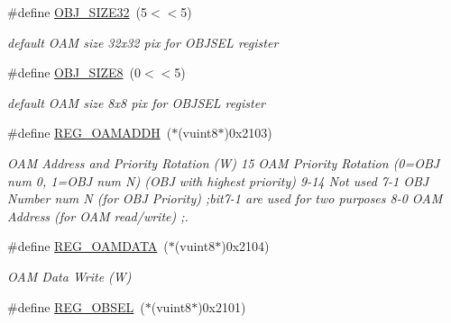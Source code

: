 \begin{DoxyCompactItemize}
\mbox{\label{a00350_abc6679a83d9647eac01c3d51ef37151a}} 
\#define \hyperlink{a00350_abc6679a83d9647eac01c3d51ef37151a}{O\+B\+J\+\_\+\+S\+I\+Z\+E32}~(5$<$$<$5)
\begin{DoxyCompactList}\small\item\em default O\+AM size 32x32 pix for O\+B\+J\+S\+EL register \end{DoxyCompactList}\item 
\mbox{\label{a00350_a6b25da5746274a43b4ffec5876fe8d5b}} 
\#define \hyperlink{a00350_a6b25da5746274a43b4ffec5876fe8d5b}{O\+B\+J\+\_\+\+S\+I\+Z\+E8}~(0$<$$<$5)
\begin{DoxyCompactList}\small\item\em default O\+AM size 8x8 pix for O\+B\+J\+S\+EL register \end{DoxyCompactList}\item 
\#define \hyperlink{a00350_ad8e30bb8ad62f2a58545ff770db95174}{R\+E\+G\+\_\+\+O\+A\+M\+A\+D\+DH}~($\ast$(vuint8$\ast$)0x2103)
\begin{DoxyCompactList}\small\item\em O\+AM Address and Priority Rotation (W) 15 O\+AM Priority Rotation (0=O\+BJ num 0, 1=O\+BJ num N) (O\+BJ with highest priority) 9-\/14 Not used 7-\/1 O\+BJ Number num N (for O\+BJ Priority) ;bit7-\/1 are used for two purposes 8-\/0 O\+AM Address (for O\+AM read/write) ;. \end{DoxyCompactList}\item 
\mbox{\label{a00350_ac7a5db74119e971459fad469a4caa92c}} 
\#define \hyperlink{a00350_ac7a5db74119e971459fad469a4caa92c}{R\+E\+G\+\_\+\+O\+A\+M\+D\+A\+TA}~($\ast$(vuint8$\ast$)0x2104)
\begin{DoxyCompactList}\small\item\em O\+AM Data Write (W) \end{DoxyCompactList}\item 
\mbox{\label{a00350_aa54aeab41da41947862d2317074d500a}} 
\#define \hyperlink{a00350_aa54aeab41da41947862d2317074d500a}{R\+E\+G\+\_\+\+O\+B\+S\+EL}~($\ast$(vuint8$\ast$)0x2101)

\end{DoxyCompactItemize}

